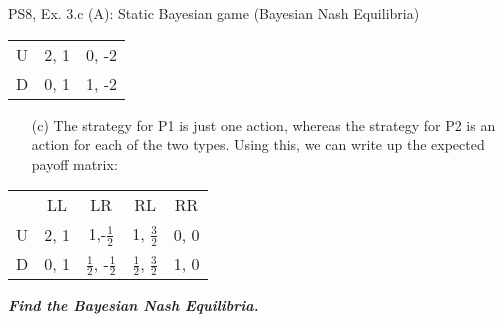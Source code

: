 \begin{frame}{PS8, Ex. 3.c (A): Static Bayesian game (Bayesian Nash Equilibria)}
\begin{multicols}{2}
\begin{table}
\begin{tabular}{l|c|c|}
          U & 2, 1 & 0, -2 \\\cline{2-3}
          D & 0, 1 & 1, -2 \\\cline{2-3}
        \end{tabular}
      \end{table}
      \vspace{-8pt}
      \begin{itemize}
          \item[(c)] The strategy for P1 is just one action, whereas the strategy for P2 is an action for each of the two types. Using this, we can write up the expected payoff matrix:
      \end{itemize}
      \vspace{-12pt}
      \begin{table}
        \begin{tabular}{l|c|c|c|c|}
          \multicolumn{1}{c}{} & \multicolumn{1}{c}{LL} & \multicolumn{1}{c}{LR} & \multicolumn{1}{c}{RL} & \multicolumn{1}{c}{RR} \\\cline{2-5}
          U & 2, 1 &  1,-$\frac{1}{2}$ & 1, $\frac{3}{2}$ & 0, 0  \\\cline{2-5}
          D & 0, 1  & $\frac{1}{2}$, -$\frac{1}{2}$ & $\frac{1}{2}$, $\frac{3}{2}$ & 1, 0  \\\cline{2-5}
        \end{tabular}
      \end{table}
      \vspace{-4pt}
      \textbf{\textit{Find the Bayesian Nash Equilibria.}}
      \vfill\null
    \end{multicols}
\end{frame}
